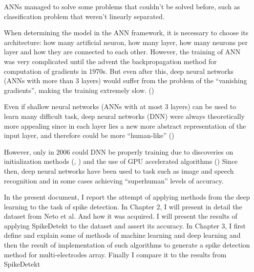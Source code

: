 ANNs managed to solve some problems that couldn't be solved before, such as classification problem that weren't linearly separated.

When determining the model in the ANN framework, it is necessary to choose its architecture: how many artificial neuron, how many layer, how many neurons per layer and how they are connected to each other.  However, the training of ANN was very complicated until the advent the backpropagation method for computation of gradients in 1970s.  But even after this, deep neural networks (ANNs with more than 3 layers) would suffer from the problem of the “vanishing gradients”, making the training extremely slow. (\cite{hochreiter2001gradient})

Even if shallow neural networks (ANNs with at most 3 layers) can be used to learn many difficult task, deep neural networks (DNN) were always theoretically more appealing since in each layer lies a new more abstract representation of the input layer, and therefore could be more “human-like” (\cite{rumelhart1988learning})

However, only in 2006 could DNN be properly training due to discoveries on initialization methods (\cite{hinton2006fast}, \cite{bengio2007greedy}) and the use of GPU accelerated algorithms (\cite{raina2009large})
Since then, deep neural networks have been used to task such as image and speech recognition and in some cases achieving “superhuman” levels of accuracy.

In the present document, I report the attempt of applying methods from the deep learning to the task of spike detection. In Chapter 2, I will present in detail the dataset from Neto et al. And how it was acquired. I will present the results of applying SpikeDetekt to the dataset and assert its accuracy. In Chapter 3, I first define and explain some of methods of machine learning and deep learning and then the result of implementation of such algorithms to generate a spike detection method for multi-electrodes array. Finally I compare it to the results from SpikeDetekt

